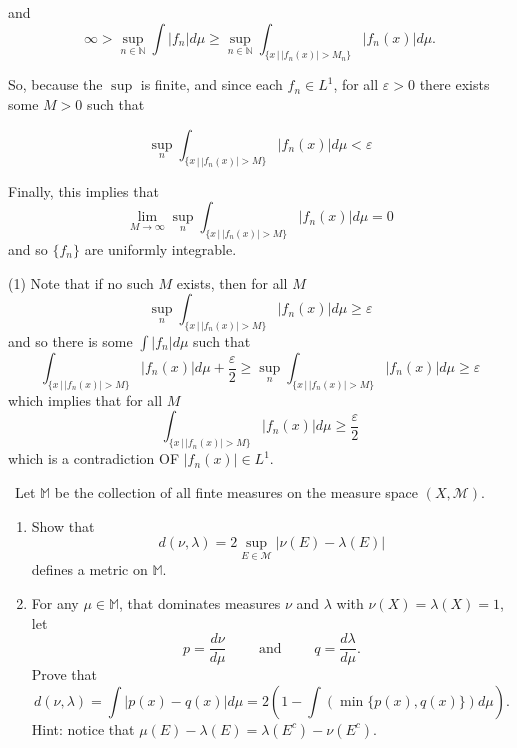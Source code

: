 \documentclass[12pt]{Qual}
\begin{document}
\begin{solution}
\begin{enumerate}[label=(\alph*)]
    and $$\infty>\sup_{n\in\mathbb{N}}\int|f_n|d\mu\ge\sup_{n\in\mathbb{N}}\int_{\{x\,|\,|f_n(x)|>M_n\}}|f_n(x)|d\mu.$$

    So, because the $\sup$ is finite, and since each $f_n\in L^1$, for all $\varepsilon>0$ there exists some $M>0$ such that

    \begin{equation}\tag{1}
        \sup_n\int_{\{x\,|\,|f_n(x)|>M\}}|f_n(x)|d\mu<\varepsilon
    \end{equation}

    Finally, this implies that $$\lim_{M\to\infty}\sup_n\int_{\{x\,|\,|f_n(x)|>M\}}|f_n(x)|d\mu=0$$ and so $\{f_n\}$ are uniformly integrable.

    \hhline

    (1) Note that if no such $M$ exists, then for all $M$ $$\sup_n\int_{\{x\,|\,|f_n(x)|>M\}}|f_n(x)|d\mu\ge\varepsilon$$ and so there is some $\int|f_n|d\mu$ such that $$\int_{\{x\,|\,|f_n(x)|>M\}}|f_n(x)|d\mu+\frac{\varepsilon}{2}\ge\sup_n\int_{\{x\,|\,|f_n(x)|>M\}}|f_n(x)|d\mu\ge\varepsilon$$ which implies that for all $M$ $$\int_{\{x\,|\,|f_n(x)|>M\}}|f_n(x)|d\mu\ge\frac{\varepsilon}{2}$$ which is a contradiction OF $|f_n(x)|\in L^1$.

    \hhline
\end{enumerate}
\end{solution}
\newpage

\begin{problem} $\,$
Let $\mathbb{M}$ be the collection of all finte measures on the measure space $(X,\mathscr{M})$.
\begin{enumerate}[label=(\alph*)]
    \item Show that $$d(\nu,\lambda)=2\sup_{E\in\mathscr{M}}|\nu(E)-\lambda(E)|$$ defines a metric on $\mathbb{M}$.
    \item For any $\mu\in\mathbb{M}$, that dominates measures $\nu$ and $\lambda$ with $\nu(X)=\lambda(X)=1$, let $$p=\frac{d\nu}{d\mu}\qquad\text{ and }\qquad q=\frac{d\lambda}{d\mu}.$$ Prove that $$d(\nu,\lambda)=\int|p(x)-q(x)|d\mu=2\left(1-\int(\min\{p(x),q(x)\})d\mu\right).$$
    Hint: notice that $\mu(E)-\lambda(E)=\lambda(E^c)-\nu(E^c)$.
\end{enumerate}
\end{problem}
\end{document}
